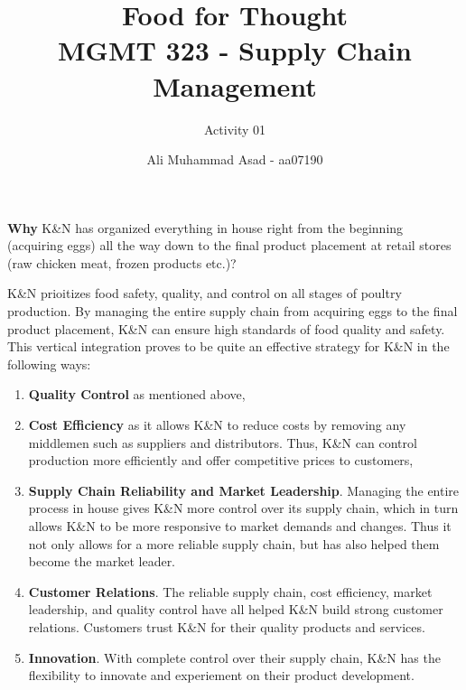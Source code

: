 \documentclass[addpoints]{exam}
\title{Food for Thought \\ MGMT 323 - Supply Chain Management}
\author{Activity 01}
\date{Ali Muhammad Asad - aa07190}
\begin{document}
\maketitle
\begin{sloppypar}
\begin{questions}
    \question \textbf{Why} K\&N has organized everything in house right from the beginning (acquiring eggs) all the way down to the final product placement at retail stores (raw chicken meat, frozen products etc.)?
    \begin{solution}
        K\&N prioitizes food safety, quality, and control on all stages of poultry production. By managing the entire supply chain from acquiring eggs to the final product placement, K\&N can ensure high standards of food quality and safety. This vertical integration proves to be quite an effective strategy for K\&N in the following ways:
        \begin{enumerate}
            \item \textbf{Quality Control} as mentioned above,
            \item \textbf{Cost Efficiency} as it allows K\&N to reduce costs by removing any middlemen such as suppliers and distributors. Thus, K\&N can control production more efficiently and offer competitive prices to customers,
            \item \textbf{Supply Chain Reliability and Market Leadership}. Managing the entire process in house gives K\&N more control over its supply chain, which in turn allows K\&N to be more responsive to market demands and changes. Thus it not only allows for a more reliable supply chain, but has also helped them become the market leader. 
            \item \textbf{Customer Relations}. The reliable supply chain, cost efficiency, market leadership, and quality control have all helped K\&N build strong customer relations. Customers trust K\&N for their quality products and services.
            \item \textbf{Innovation}. With complete control over their supply chain, K\&N has the flexibility to innovate and experiement on their product development.
        \end{enumerate}
    \end{solution}


\end{questions}
\end{sloppypar}
\end{document}
